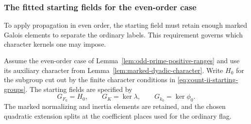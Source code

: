 \subsubsection{The fitted starting fields for the even-order case}
\label{par:count-ii-tower}

To apply propagation in even order, the starting field must retain enough marked Galois elements to separate the ordinary labels. This requirement governs which character kernels one may impose.

\begin{proposition}\label{prop:count-ii-starting-field}
Assume the even-order case of
Lemma~\ref{lem:odd-prime-positive-ranges} and use its auxiliary
character from Lemma~\ref{lem:marked-dyadic-character}.
Write \(H_0\) for the subgroup cut out by the finite character conditions in \eqref{eq:count-ii-starting-groups}. The starting fields are specified by 
\[
 G_{F_0}=H_0,\qquad G_K=\ker\lambda,\qquad G_{k_0}=\ker\phi_0.
\]
 The marked normalizing and inertia elements
are retained, and the chosen quadratic extension splits at the
coefficient places used for the ordinary flag.
\end{proposition}

